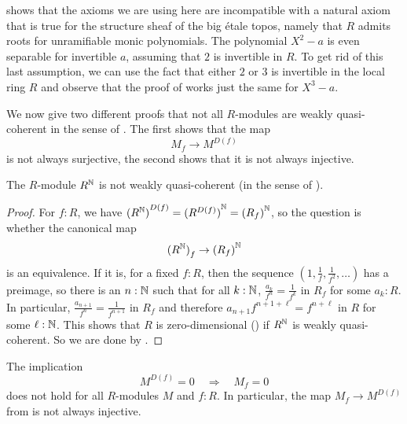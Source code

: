 \begin{remark}
   shows that
  the axioms we are using here
  are incompatible with a natural axiom that is true
  for the structure sheaf of the big étale topos,
  namely that $R$ admits roots for unramifiable monic polynomials.
  The polynomial $X^2 - a$ is even separable for invertible $a$,
  assuming that $2$ is invertible in $R$.
  To get rid of this last assumption,
  we can use the fact that either $2$ or $3$ is invertible in the local ring $R$
  and observe that the proof of 
  works just the same for $X^3 - a$.
\end{remark}

We now give two different proofs that not all $R$-modules are weakly quasi-coherent
in the sense of .
The first shows that the map
\[ M_f \to M^{D(f)} \]
is not always surjective,
the second shows that it is not always injective.

\begin{proposition}%
  \label{RN-non-wqc}
  The $R$-module $R^{\mathbb{N}}$ is not weakly quasi-coherent
  (in the sense of ).
\end{proposition}

\begin{proof}
  For $f : R$,
  we have ${(R^{\mathbb{N}})}^{D(f)} = {(R^{D(f)})}^{\mathbb{N}} = {(R_f)}^{\mathbb{N}}$,
  so the question is whether the canonical map
  \[ {(R^{\mathbb{N}})}_f \to {(R_f)}^{\mathbb{N}} \]
  is an equivalence.
  If it is,
  for a fixed $f : R$,
  then the sequence $(1, \frac{1}{f}, \frac{1}{f^2}, \dots)$
  has a preimage,
  so there is an $n : \mathbb{N}$ such that
  for all $k : \mathbb{N}$,
  $\frac{a_k}{f^n} = \frac{1}{f^k}$ in $R_f$
  for some $a_k : R$.
  In particular, $\frac{a_{n+1}}{f^n} = \frac{1}{f^{n+1}}$ in $R_f$
  and therefore $a_{n+1} f^{n+1+\ell} = f^{n+\ell}$ in $R$ for some $\ell : \mathbb{N}$.
  This shows that $R$ is zero-dimensional
  ()
  if $R^{\mathbb{N}}$ is weakly quasi-coherent.
  So we are done by .
\end{proof}

\begin{proposition}%
  \label{non-wqc-module-family}
  The implication
  \[ M^{D(f)} = 0 \quad\Rightarrow\quad M_f = 0 \]
  does not hold for all $R$-modules $M$ and $f : R$.
  In particular,
  the map $M_f \to M^{D(f)}$ from 
  is not always injective.
\end{proposition}

